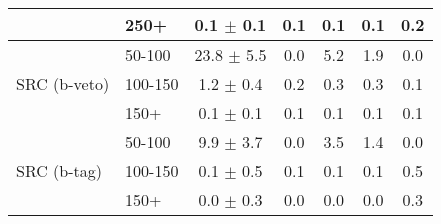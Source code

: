 \begin{table}[ht!]
\begin{tabular}{l l c c c c c}
                      & 250+     & 0.1  $\pm$ 0.1  & 0.1& 0.1  & 0.1 & 0.2 \\ \hline
\multirow{ 3}{*}{SRC (b-veto)}& 50-100   & 23.8  $\pm$ 5.5  & 0.0& 5.2  & 1.9 & 0.0 \\
                     & 100-150  & 1.2   $\pm$ 0.4  & 0.2& 0.3  & 0.3 & 0.1 \\
                     & 150+     & 0.1   $\pm$ 0.1  & 0.1& 0.1  & 0.1 & 0.1 \\\hline
\multirow{ 3}{*}{SRC (b-tag)}& 50-100   & 9.9  $\pm$ 3.7  & 0.0& 3.5  & 1.4 & 0.0 \\
                      & 100-150  & 0.1  $\pm$ 0.5  & 0.1& 0.1  & 0.1 & 0.5 \\
                      & 150+     & 0.0  $\pm$ 0.3  & 0.0& 0.0  & 0.0 & 0.3 \\\hline\hline
\end{tabular}
\end{table}

